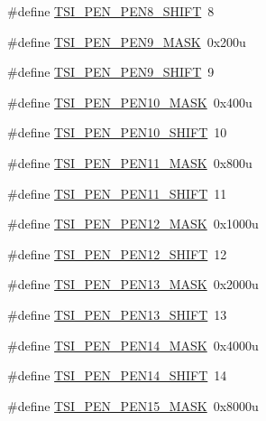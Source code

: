 \begin{DoxyCompactItemize}
\#define \hyperlink{group___t_s_i___register___masks_ga822574504a16f31bf6172fc5b582f963}{T\+S\+I\+\_\+\+P\+E\+N\+\_\+\+P\+E\+N8\+\_\+\+S\+H\+I\+FT}~8
\item 
\#define \hyperlink{group___t_s_i___register___masks_ga614663f54a6b349074b981f83bda0e84}{T\+S\+I\+\_\+\+P\+E\+N\+\_\+\+P\+E\+N9\+\_\+\+M\+A\+SK}~0x200u
\item 
\#define \hyperlink{group___t_s_i___register___masks_ga23492a8b439df4e9414fbae2cf54742f}{T\+S\+I\+\_\+\+P\+E\+N\+\_\+\+P\+E\+N9\+\_\+\+S\+H\+I\+FT}~9
\item 
\#define \hyperlink{group___t_s_i___register___masks_ga4a5e83e197e558ed636a8531f63a51a0}{T\+S\+I\+\_\+\+P\+E\+N\+\_\+\+P\+E\+N10\+\_\+\+M\+A\+SK}~0x400u
\item 
\#define \hyperlink{group___t_s_i___register___masks_gae26e707910b5a4ed3a2bfc7397c7fdf8}{T\+S\+I\+\_\+\+P\+E\+N\+\_\+\+P\+E\+N10\+\_\+\+S\+H\+I\+FT}~10
\item 
\#define \hyperlink{group___t_s_i___register___masks_ga2692c92efabc1272aadd492fedaf8117}{T\+S\+I\+\_\+\+P\+E\+N\+\_\+\+P\+E\+N11\+\_\+\+M\+A\+SK}~0x800u
\item 
\#define \hyperlink{group___t_s_i___register___masks_ga7cf23edbaaf2d70825a3af3774076230}{T\+S\+I\+\_\+\+P\+E\+N\+\_\+\+P\+E\+N11\+\_\+\+S\+H\+I\+FT}~11
\item 
\#define \hyperlink{group___t_s_i___register___masks_ga686745e0ce974aeda129cb1ad92792b5}{T\+S\+I\+\_\+\+P\+E\+N\+\_\+\+P\+E\+N12\+\_\+\+M\+A\+SK}~0x1000u
\item 
\#define \hyperlink{group___t_s_i___register___masks_ga4e6356a9326382d6696b9249ad74ec3b}{T\+S\+I\+\_\+\+P\+E\+N\+\_\+\+P\+E\+N12\+\_\+\+S\+H\+I\+FT}~12
\item 
\#define \hyperlink{group___t_s_i___register___masks_ga47604061f85253c63ae3846adea3f36a}{T\+S\+I\+\_\+\+P\+E\+N\+\_\+\+P\+E\+N13\+\_\+\+M\+A\+SK}~0x2000u
\item 
\#define \hyperlink{group___t_s_i___register___masks_gaa2beb25ccfcccb7bb0032fa6f42b80f7}{T\+S\+I\+\_\+\+P\+E\+N\+\_\+\+P\+E\+N13\+\_\+\+S\+H\+I\+FT}~13
\item 
\#define \hyperlink{group___t_s_i___register___masks_gaa4403e6fd78c53717c22d34c9d082d8c}{T\+S\+I\+\_\+\+P\+E\+N\+\_\+\+P\+E\+N14\+\_\+\+M\+A\+SK}~0x4000u
\item 
\#define \hyperlink{group___t_s_i___register___masks_ga20c8a6fee93df97db5d2191bd6d72b09}{T\+S\+I\+\_\+\+P\+E\+N\+\_\+\+P\+E\+N14\+\_\+\+S\+H\+I\+FT}~14
\item 
\#define \hyperlink{group___t_s_i___register___masks_ga1cbf93a7b5646316b3013106b096951c}{T\+S\+I\+\_\+\+P\+E\+N\+\_\+\+P\+E\+N15\+\_\+\+M\+A\+SK}~0x8000u

\end{DoxyCompactItemize}
